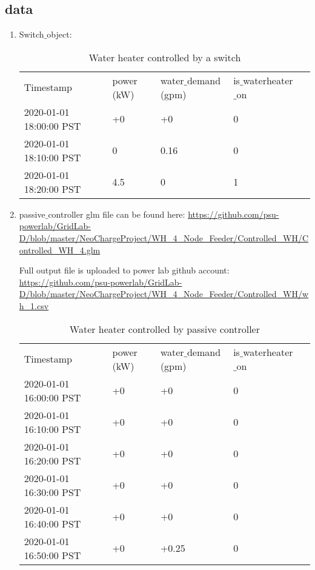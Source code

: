 \subsection{data}
    \begin{enumerate}
        \item Switch$\_$object:
        
    
\begin{table}[h]
\begin{tabular}{|l|l|l|l|l}

\cline{1-4}
Timestamp & power (kW) & water$\_$demand (gpm) & is$\_$waterheater$\_$on & \\ \cline{1-4}
2020-01-01 18:00:00 PST & +0 & +0 & 0 & \\ \cline{1-4}
2020-01-01 18:10:00 PST & 0 & 0.16 & 0 &  \\ \cline{1-4}
2020-01-01 18:20:00 PST & 4.5 & 0 & 1 &  \\ \cline{1-4}
\end{tabular}
\caption{Water heater controlled by a switch}
\label{table:1}
\end{table}
        \item passive$\_$controller \newline
        glm file can be found here: \url{https://github.com/psu-powerlab/GridLab-D/blob/master/NeoChargeProject/WH_4_Node_Feeder/Controlled_WH/Controlled_WH_4.glm} \newline \par
        
        Full output file is uploaded to power lab github account: \url{https://github.com/psu-powerlab/GridLab-D/blob/master/NeoChargeProject/WH_4_Node_Feeder/Controlled_WH/wh_1.csv}
        
        \begin{table}[h]
        \begin{tabular}{|l|l|l|l|l}
        \cline{1-4}
        Timestamp & power (kW) & water$\_$demand (gpm) & is$\_$waterheater$\_$on & \\ \cline{1-4}
        2020-01-01 16:00:00 PST & +0 & +0 & 0 & \\ \cline{1-4}
        2020-01-01 16:10:00 PST & +0 & +0 & 0 &  \\ \cline{1-4}
        2020-01-01 16:20:00 PST & +0 & +0 & 0 &  \\ \cline{1-4}
        2020-01-01 16:30:00 PST & +0 & +0 & 0 &  \\ \cline{1-4}
        2020-01-01 16:40:00 PST & +0 & +0 & 0 &  \\ \cline{1-4}
        2020-01-01 16:50:00 PST & +0 & +0.25 & 0 &  \\ \cline{1-4}
        \end{tabular}
        \caption{Water heater controlled by passive controller}
        \label{table:2}
        \end{table}
        

\end{enumerate}
